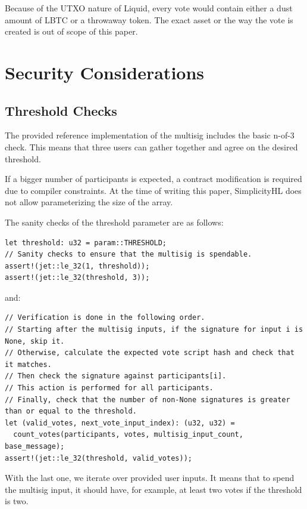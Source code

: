 \documentclass[11pt]{article}
\begin{document}
Because of the UTXO nature of Liquid, every vote would contain either a dust amount of LBTC or a throwaway token.
The exact asset or the way the vote is created is out of scope of this paper.

\section{Security Considerations}

\subsection{Threshold Checks}

The provided reference implementation of the multisig \cite{native-multisig-multisig} includes the basic n-of-3 check.
This means that three users can gather together and agree on the desired threshold.

If a bigger number of participants is expected, a contract modification is required due to compiler constraints.
At the time of writing this paper, SimplicityHL does not allow parameterizing the size of the array.

The sanity checks of the threshold parameter are as follows:

\begin{lstlisting}
let threshold: u32 = param::THRESHOLD;
// Sanity checks to ensure that the multisig is spendable.
assert!(jet::le_32(1, threshold));
assert!(jet::le_32(threshold, 3));
\end{lstlisting}

and:

\begin{lstlisting}
// Verification is done in the following order.
// Starting after the multisig inputs, if the signature for input i is None, skip it.
// Otherwise, calculate the expected vote script hash and check that it matches.
// Then check the signature against participants[i].
// This action is performed for all participants.
// Finally, check that the number of non-None signatures is greater than or equal to the threshold.
let (valid_votes, next_vote_input_index): (u32, u32) =
  count_votes(participants, votes, multisig_input_count, base_message);
assert!(jet::le_32(threshold, valid_votes));
\end{lstlisting}

With the last one, we iterate over provided user inputs.
It means that to spend the multisig input, it should have, for example, at least two votes if the threshold is two.
\end{document}
